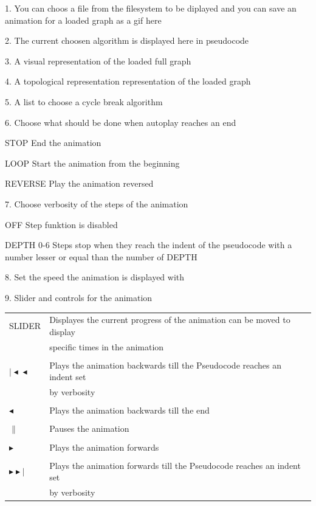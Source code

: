 \begin{list}{-}{}
\item[1.] You can choos a file from the filesystem to be diplayed and you can save an animation for a loaded graph as a gif here
\item[2.] The current choosen algorithm is displayed here in pseudocode
\item[3.] A visual representation of the loaded full graph
\item[4.] A topological representation representation of the loaded graph
\item[5.] A list to choose a cycle break algorithm
\item[6.] Choose what should be done when autoplay reaches an end
\begin{list}{-}{}
\item[STOP] End the animation
\item[LOOP] Start the animation from the beginning
\item[REVERSE] Play the animation reversed
\end{list}
\item[7.] Choose verbosity of the steps of the animation
\begin{list}{-}{}
\item[OFF] Step funktion is disabled
\item[DEPTH 0-6] Steps stop when they reach the indent of the pseudocode with a number lesser or equal than the number of DEPTH
\end{list}
\item[8.] Set the speed the animation is displayed with
\item[9.] Slider and controls for the animation

\begin{tabular}{l l}
SLIDER & Displayes the current progress of the animation can be moved to display\\& specific times in the animation\\ \\
$\mid \! \blacktriangleleft \! \blacktriangleleft$ & Plays the animation backwards till the Pseudocode reaches an indent set\\ & by verbosity \\ \\
$\blacktriangleleft$ & Plays the animation backwards till the end \\ \\
\textbf{$\|$} & Pauses the animation \\ \\
$ \blacktriangleright $  &  Plays the animation forwards \\ \\
$ \blacktriangleright \! \blacktriangleright \! \! \!|$ &  Plays the animation forwards till the Pseudocode reaches an indent set\\& by verbosity\\
\end{tabular}
\end{list}